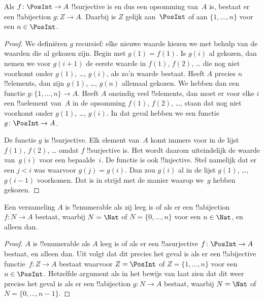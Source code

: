 \documentclass[openany]{memoir}
\begin{document}
\begin{prop}
Als $f\colon \PosInt \to A$ !!{surjective} is en dus een opsomming
van~$A$ is, bestaat er een !!a{bijection} $g\colon Z \to A$. Daarbij
is $Z$ gelijk aan~$\PosInt$ of aan $\{1, \dots, n\}$ voor een
$n \in \PosInt$.
\end{prop}

\begin{proof}
  We definiëren $g$ recursief: elke nieuwe waarde kiezen we met behulp
  van de waarden die al gekozen zijn. Begin met
  $g(1) = f(1)$. Is $g(i)$ al gekozen, dan nemen we voor $g(i+1)$ de
  eerste waarde in $f(1)$, $f(2)$, \dots{} die nog niet voorkomt onder
  $g(1)$, \dots, $g(i)$, als zo'n waarde bestaat. Heeft $A$ precies $n$
  !!{element}s, dan zijn $g(1)$, \dots, $g(n)$ allemaal gekozen. We
  hebben dan een functie $g\colon \{1, \dots, n\} \to A$. Heeft $A$
  oneindig veel !!{element}s, dan moet er voor elke $i$ een
  !!a{element} van~$A$ in de opsomming $f(1)$, $f(2)$, \dots, staan dat
  nog niet voorkomt onder $g(1)$, \dots, $g(i)$. In dat geval hebben we
  een functie $g\colon \PosInt \to A$.
  
  De functie $g$ is !!{surjective}. Elk element van~$A$ komt immers voor
  in de lijst $f(1)$, $f(2)$, \dots{} omdat $f$ !!{surjective} is. Het wordt
  daarom uiteindelijk de waarde van~$g(i)$ voor een bepaalde~$i$.
  De functie is ook !!{injective}. Stel namelijk dat er een $j < i$
  was waarvoor $g(j) = g(i)$. Dan zou $g(i)$ al in de lijst $g(1)$, \dots,
  $g(i-1)$ voorkomen. Dat is in strijd met de manier waarop we~$g$ hebben
  gekozen.
\end{proof}

\begin{cor}
Een verzameling $A$ is !!{enumerable} als zij leeg is of als er een
!!a{bijection} $f\colon N \to A$ bestaat, waarbij $N = \Nat$ of
$N = \{0, \dots, n\}$ voor een $n \in \Nat$, en alleen dan.
\end{cor}

\begin{proof}
$A$ is !!{enumerable} als $A$ leeg is of als er een !!a{surjective}
$f\colon \PosInt \to A$ bestaat, en alleen dan. Uit
 volgt dat dit precies het geval is als er een
!!a{bijective} functie~$f\colon Z \to A$ bestaat waarvoor $Z =
\PosInt$ of $Z = \{1, \dots, n\}$ voor een $n \in \PosInt$. Hetzelfde
argument als in het bewijs van  laat zien dat
dit weer precies het geval is als er een !!a{bijection}
$g\colon N \to A$ bestaat, waarbij $N = \Nat$ of
$N = \{0, \dots, n-1\}$.
\end{proof}
\end{document}
